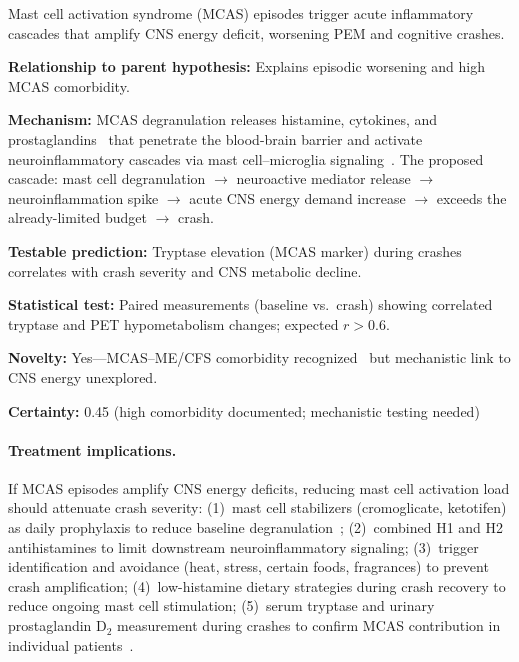 \begin{hypothesis}
\label{hyp:mcas-amplifier}
Mast cell activation syndrome (MCAS) episodes trigger acute inflammatory cascades that amplify CNS energy deficit, worsening PEM and cognitive crashes.

\textbf{Relationship to parent hypothesis:} Explains episodic worsening and high MCAS comorbidity.

\textbf{Mechanism:} MCAS degranulation releases histamine, cytokines, and prostaglandins~\cite{Frioni2025MCAS} that penetrate the blood-brain barrier and activate neuroinflammatory cascades via mast cell--microglia signaling~\cite{Zhang2024MastBrain,Lakatos2025mastMicroglia}. The proposed cascade: mast cell degranulation $\to$ neuroactive mediator release $\to$ neuroinflammation spike $\to$ acute CNS energy demand increase $\to$ exceeds the already-limited budget $\to$ crash.

\textbf{Testable prediction:} Tryptase elevation (MCAS marker) during crashes correlates with crash severity and CNS metabolic decline.

\textbf{Statistical test:} Paired measurements (baseline vs.\ crash) showing correlated tryptase and PET hypometabolism changes; expected $r > 0.6$.

\textbf{Novelty:} Yes---MCAS--ME/CFS comorbidity recognized~\cite{Frioni2025MCAS} but mechanistic link to CNS energy unexplored.

\textbf{Certainty:} 0.45 (high comorbidity documented; mechanistic testing needed)

\paragraph{Treatment implications.}
If MCAS episodes amplify CNS energy deficits, reducing mast cell activation load should attenuate crash severity: (1)~mast cell stabilizers (cromoglicate, ketotifen) as daily prophylaxis to reduce baseline degranulation~\cite{Frioni2025MCAS}; (2)~combined H1 and H2 antihistamines to limit downstream neuroinflammatory signaling; (3)~trigger identification and avoidance (heat, stress, certain foods, fragrances) to prevent crash amplification; (4)~low-histamine dietary strategies during crash recovery to reduce ongoing mast cell stimulation; (5)~serum tryptase and urinary prostaglandin D$_2$ measurement during crashes to confirm MCAS contribution in individual patients~\cite{Frioni2025MCAS}.


\end{hypothesis}
